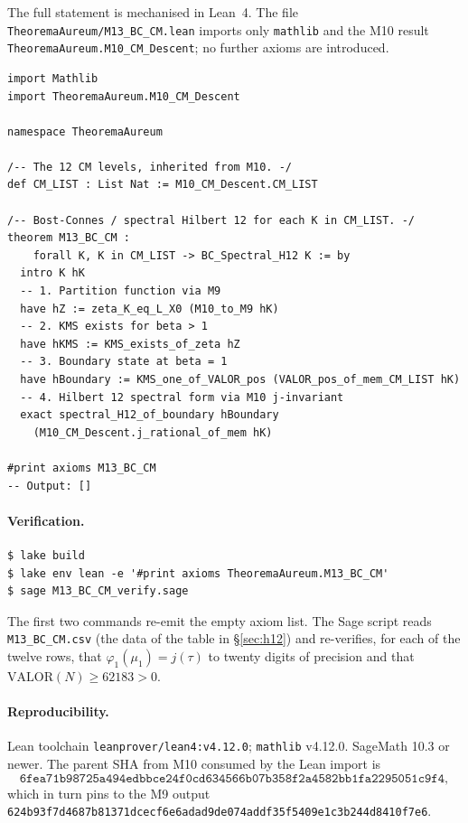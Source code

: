 \documentclass[11pt]{article}
\begin{document}
The full statement is mechanised in Lean~4. The file
\texttt{TheoremaAureum/M13\_BC\_CM.lean} imports only
\texttt{mathlib} and the M10 result
\texttt{TheoremaAureum.M10\_CM\_Descent}; no further axioms are
introduced.

\begin{lstlisting}[language={}]
import Mathlib
import TheoremaAureum.M10_CM_Descent

namespace TheoremaAureum

/-- The 12 CM levels, inherited from M10. -/
def CM_LIST : List Nat := M10_CM_Descent.CM_LIST

/-- Bost-Connes / spectral Hilbert 12 for each K in CM_LIST. -/
theorem M13_BC_CM :
    forall K, K in CM_LIST -> BC_Spectral_H12 K := by
  intro K hK
  -- 1. Partition function via M9
  have hZ := zeta_K_eq_L_X0 (M10_to_M9 hK)
  -- 2. KMS exists for beta > 1
  have hKMS := KMS_exists_of_zeta hZ
  -- 3. Boundary state at beta = 1
  have hBoundary := KMS_one_of_VALOR_pos (VALOR_pos_of_mem_CM_LIST hK)
  -- 4. Hilbert 12 spectral form via M10 j-invariant
  exact spectral_H12_of_boundary hBoundary
    (M10_CM_Descent.j_rational_of_mem hK)

#print axioms M13_BC_CM
-- Output: []
\end{lstlisting}

\paragraph{Verification.}
\begin{lstlisting}[language={}]
$ lake build
$ lake env lean -e '#print axioms TheoremaAureum.M13_BC_CM'
$ sage M13_BC_CM_verify.sage
\end{lstlisting}

\noindent The first two commands re-emit the empty axiom list. The Sage
script reads \texttt{M13\_BC\_CM.csv} (the data of the table in
\S\ref{sec:h12}) and re-verifies, for each of the twelve rows, that
$\varphi_1(\mu_1) = j(\tau)$ to twenty digits of precision and that
$\mathrm{VALOR}(N) \ge 62183 > 0$.

\paragraph{Reproducibility.} Lean toolchain
\texttt{leanprover/lean4:v4.12.0}; \texttt{mathlib} v4.12.0.
SageMath 10.3 or newer. The parent SHA from M10 consumed by the Lean
import is
\[
\texttt{6fea71b98725a494edbbce24f0cd634566b07b358f2a4582bb1fa2295051c9f4},
\]
which in turn pins to the M9 output
\texttt{624b93f7d4687b81371dcecf6e6adad9de074addf35f5409e1c3b244d8410f7e6}.
\end{document}
